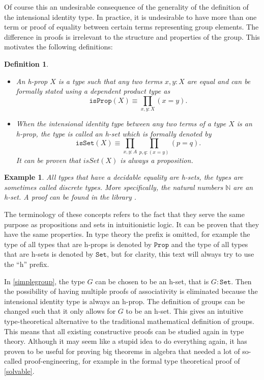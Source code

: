\documentclass[12pt,a4paper,twoside,xetex]{book} %
\newcommand{\keyword}[1]{\emph{#1}\index{#1}}
\newtheorem{definition}[theorem]{Definition}
\newtheorem{example}[theorem]{Example}
\newcommand{\op}[1]{\mathtt{#1}}
\begin{document}
Of course this an undesirable consequence of the generality of the definition 
of the intensional identity type. In practice, it is undesirable to have more 
than one term or proof of equality between certain terms representing group 
elements. The difference in proofs is irrelevant to the structure and properties 
of the group. This motivates the following definitions:

\begin{definition}\label{hset}
\begin{itemize}
\item  An \keyword{h-prop} $X$ is a type such that any two terms $x,y:X$ are 
equal and can be formally stated using a dependent product type as $$\op{isProp}(X) \equiv 
\prod_{x,y:X}(x=y).$$
\item When the intensional identity type between any two terms of a type $X$ is 
an h-prop, the type is called an \keyword{h-set} which is formally denoted by 
$$\op{isSet}(X) \equiv \prod_{x,y:A}\prod_{p,q:(x=y)}(p=q).$$ It can be proven 
that $isSet(X)$ is always a proposition.
\end{itemize}
\end{definition}

\begin{example}
All types that have a decidable equality are h-sets, the types are sometimes called \keyword{discrete types}. More specifically, the natural numbers $\mathbb{N}$ are an h-set. A proof can be found in the library \cite{Moertberg2018}.
\end{example}


The terminology of these concepts refers to the fact that they serve the same 
purpose as propositions and sets in intuitionistic logic. It can be proven that 
they have the same properties. In type theory the prefix is omitted, for 
example the type of all types that are h-props is denoted by $\op{Prop}$ and the 
type of all types that are h-sets is denoted by $\texttt{Set}$, but for clarity, this text will always try to use the ``h'' prefix.

In \cref{simplegroup}, the type $G$ can be chosen to be an h-set, that is $G: 
\op{Set}$. Then the possibility of having multiple proofs of associativity is 
eliminated because the intensional identity type is always an h-prop. The 
definition of groups can be changed such that it only allows for $G$ to be an 
h-set. This gives an intuitive type-theoretical alternative to the 
traditional mathematical definition of groups. This means that all existing 
constructive proofs can be studied again in type theory. Although it may seem 
like a stupid idea to do everything again, it has proven to be useful for proving big theorems in algebra that needed a lot of so-called 
proof-engineering, for example in the formal type theoretical proof of \cref{solvable}.
\end{document}
